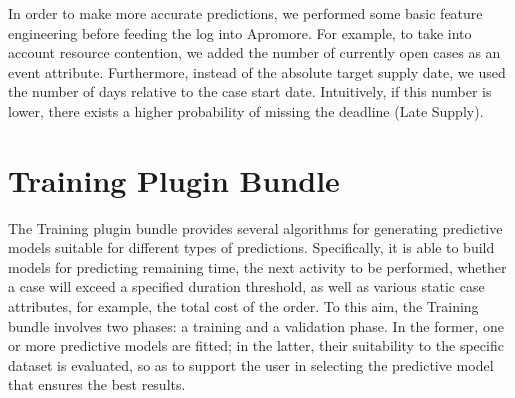 \documentclass[runningheads,a4paper]{llncs}
\begin{document}
In order to make more accurate predictions, we performed some basic feature engineering before feeding the log into Apromore. For example, to take into account resource contention, we added the number of currently open cases as an event attribute. Furthermore, instead of the absolute target supply date, we used the number of days relative to the case start date. Intuitively, if this number is lower, there exists a higher probability of missing the deadline (Late Supply).

\section{Training Plugin Bundle} \label{sec:training}
The Training plugin bundle provides several algorithms for generating predictive models suitable for different types of predictions. Specifically, it is able to build models for predicting remaining time, the next activity to be performed, whether a case will exceed a specified duration threshold, as well as various static case attributes, for example, the total cost of the order.
%
To this aim, the Training bundle involves two phases: a training and a validation phase. In the former, one or more predictive models are fitted; in the latter, their suitability to the specific dataset is evaluated, so as to support the user in selecting the predictive model that ensures the best results.
\end{document}
